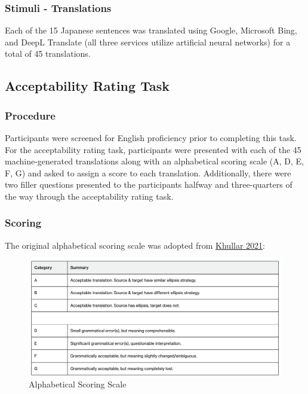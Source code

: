 \documentclass[
  man,floatsintext]{apa6}
\begin{document}
\hypertarget{stimuli---translations}{%
\subsubsection{Stimuli - Translations}\label{stimuli---translations}}

Each of the 15 Japanese sentences was translated using Google, Microsoft Bing, and DeepL Translate (all three services utilize artificial neural networks) for a total of 45 translations.

\hypertarget{acceptability-rating-task}{%
\subsection{Acceptability Rating Task}\label{acceptability-rating-task}}

\hypertarget{procedure}{%
\subsubsection{Procedure}\label{procedure}}

Participants were screened for English proficiency prior to completing this task. For the acceptability rating task, participants were presented with each of the 45 machine-generated translations along with an alphabetical scoring scale (A, D, E, F, G) and asked to assign a score to each translation. Additionally, there were two filler questions presented to the participants halfway and three-quarters of the way through the acceptability rating task.

\hypertarget{scoring}{%
\subsubsection{Scoring}\label{scoring}}

The original alphabetical scoring scale was adopted from \href{https://direct.mit.edu/coli/article/47/4/927/106771/Are-Ellipses-Important-for-Machine-Translation}{Khullar 2021}:

\begin{figure}
\centering
\includegraphics{../figs/alphabetical_scoring.png}
\caption{Alphabetical Scoring Scale}
\end{figure}
\end{document}
